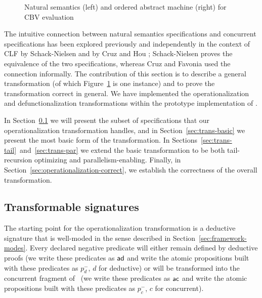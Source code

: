 \begin{figure}
\begin{minipage}[b]{0.36\linewidth}
\end{minipage}
\hspace{0.5cm}
\begin{minipage}[b]{0.64\linewidth}
\end{minipage}
\caption{Natural semantics (left) and ordered abstract machine (right) for 
CBV evaluation}
\label{fig:example-transform-cbv}
\end{figure}

The intuitive connection between natural semantics specifications and
concurrent specifications has been explored previously and
independently in the context of CLF by Schack-Nielsen
\cite{schacknielsen07induction} and by Cruz and Hou
\cite{cruz12parallel}; Schack-Nielsen proves the equivalence of the
two specifications, whereas Cruz and Favonia used the connection
informally. The contribution of this section is to describe a general
transformation (of which Figure~\ref{fig:example-transform-cbv} is one
instance) and to prove the transformation correct in general. We have
implemented the operationalization
and defunctionalization transformations within the prototype
implementation of \sls.

In Section~\ref{sec:trans-subset} we will present the subset of
specifications that our operationalization transformation handles, and
in Section~\ref{sec:trans-basic} we present the most basic form of the
transformation.  In
Sections~\ref{sec:trans-tail}~and~\ref{sec:trans-par} we extend the
basic transformation to be both tail-recursion optimizing and
parallelism-enabling. Finally, in
Section~\ref{sec:operationalization-correct}, we establish the
correctness of the overall transformation.

\subsection{Transformable signatures}
\label{sec:trans-subset}

The starting point for the operationalization transformation is a
deductive signature that is well-moded in the sense described in
Section~\ref{sec:framework-modes}. Every declared negative predicate
will either remain defined by deductive proofs (we write these
predicates as ${\sf ad}$ and write the atomic propositions built with
these predicates as $p_d^-$, $d$ for deductive) or will be transformed
into the concurrent fragment of \sls~(we write these predicates as ${\sf
  ac}$ and write the atomic propositions built with these predicates
as $p_c^-$, $c$ for concurrent).

